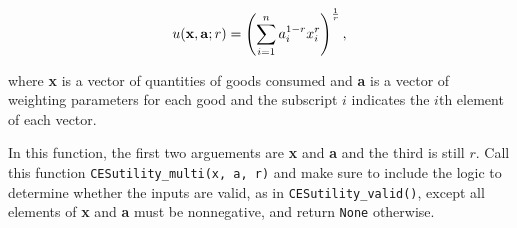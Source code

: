 \documentclass[11pt]{exam}
\begin{document}
\begin{questions}
\begin{parts}
$$u(\text{\textbf{x}}, \text{\textbf{a}}; r) = \left(\sum_{i=1}^{n}a_{i}^{1-r}x_{i}^{r}\right)^{\frac{1}{r}},$$
        
where \textbf{x} is a vector of quantities of goods consumed and \textbf{a} is a vector of weighting parameters for each good and the subscript $i$ indicates the $i$th element of each vector. 

In this function, the first two arguements are \textbf{x} and \textbf{a} and the third is still $r$. Call this function \texttt{CESutility\_multi(x, a, r)} and make sure to include the logic to determine whether the inputs are valid, as in \texttt{CESutility\_valid()}, except all elements of \textbf{x} and \textbf{a} must be nonnegative, and return \texttt{None} otherwise.
        \end{parts}

    \end{questions}
\end{document}
